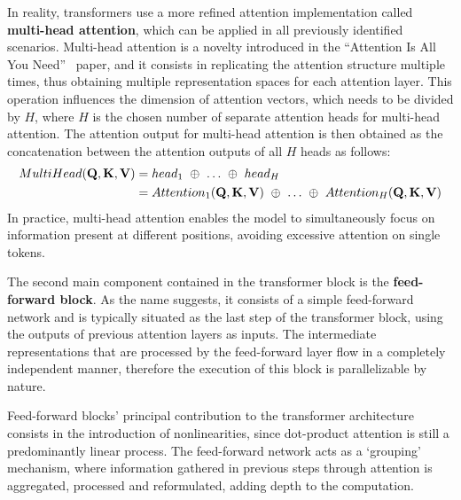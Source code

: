 In reality, transformers use a more refined attention implementation called \textbf{multi-head attention}, which can be applied in all previously identified scenarios.
Multi-head attention is a novelty introduced in the ``Attention Is All You Need''~\cite{vaswani2017} paper, and it consists in replicating the attention structure multiple times, thus obtaining multiple representation spaces for each attention layer.
This operation influences the dimension of attention vectors, which needs to be divided by $H$, where $H$ is the chosen number of separate attention heads for multi-head attention.
The attention output for multi-head attention is then obtained as the concatenation between the attention outputs of all $H$ heads as follows:
\begin{equation}
    \label{eq:background_multihead-attention}
    \begin{aligned}
    MultiHead(\gbm{Q},\gbm{K},\gbm{V})    &= head_1\ \oplus\ \ldots\ \oplus\ head_H \\
                        &= Attention_1(\gbm{Q},\gbm{K},\gbm{V})\ \oplus\ \ldots\ \oplus\ Attention_H(\gbm{Q},\gbm{K},\gbm{V})
    \end{aligned}
\end{equation}
In practice, multi-head attention enables the model to simultaneously focus on information present at different positions, avoiding excessive attention on single tokens.

The second main component contained in the transformer block is the \textbf{feed-forward block}.
As the name suggests, it consists of a simple feed-forward network and is typically situated as the last step of the transformer block, using the outputs of previous attention layers as inputs.
The intermediate representations that are processed by the feed-forward layer flow in a completely independent manner, therefore the execution of this block is parallelizable by nature.

Feed-forward blocks' principal contribution to the transformer architecture consists in the introduction of nonlinearities, since dot-product attention is still a predominantly linear process.
The feed-forward network acts as a `grouping' mechanism, where information gathered in previous steps through attention is aggregated, processed and reformulated, adding depth to the computation.

